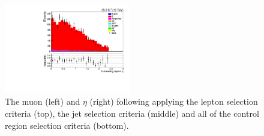 \begin{figure}[ht]
\includegraphics[width=0.49\textwidth]{figs/background-estimation/plots/unblinded/ttbar_control/lep2Eta_SingleTop_wMass_emu.pdf}
\caption{
The muon \pT (left) and $\eta$ (right) following applying the lepton selection criteria (top), the jet selection criteria (middle) and all of the \ttbar control region selection criteria (bottom).
}
\label{fig:ttbar_muon}
\end{figure}

